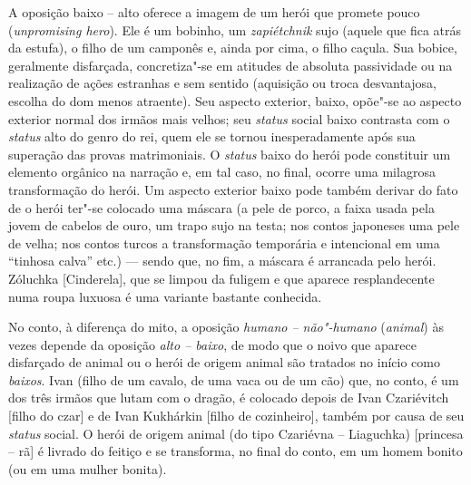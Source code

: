 


A oposição baixo -- alto oferece a imagem de um herói que promete pouco
(\emph{unpromising hero}). Ele é um bobinho, um \emph{zapiétchnik} sujo
(aquele que fica atrás da estufa), o filho de um camponês e, ainda por
cima, o filho caçula. Sua bobice, geralmente disfarçada, concretiza"-se
em atitudes de absoluta passividade ou na realização de ações estranhas
e sem sentido (aquisição ou troca desvantajosa, escolha do dom menos
atraente). Seu aspecto exterior, baixo, opõe"-se ao aspecto exterior
normal dos irmãos mais velhos; seu \emph{status} social baixo contrasta com
o \emph{status} alto do genro do rei, quem ele se tornou inesperadamente após
sua superação das provas matrimoniais. O \emph{status} baixo do herói pode
constituir um elemento orgânico na narração e, em tal caso, no final,
ocorre uma milagrosa transformação do herói. Um aspecto exterior baixo
pode também derivar do fato de o herói ter"-se colocado uma máscara (a
pele de porco, a faixa usada pela jovem de cabelos de ouro, um trapo
sujo na testa; nos contos japoneses uma pele de velha; nos contos turcos
a transformação temporária e intencional em uma ``tinhosa calva'' etc.)
--- sendo que, no fim, a máscara é arrancada pelo herói. Zóluchka
[Cinderela], que se limpou da fuligem e que aparece resplandecente
numa roupa luxuosa é uma variante bastante conhecida.

No conto, à diferença do mito, a oposição \emph{humano --
não"-humano} (\emph{animal}) às vezes depende da oposição \emph{alto -- baixo}, de
modo que o noivo que aparece disfarçado de animal ou o herói de origem
animal são tratados no início como \emph{baixos}. Ivan (filho de um cavalo,
de uma vaca ou de um cão) que, no conto, é um dos três irmãos que lutam
com o dragão, é colocado depois de Ivan Czariévitch [filho do czar]
e de Ivan Kukhárkin [filho de cozinheiro], também por causa de
seu \emph{status} social. O herói de origem animal (do tipo Czariévna --
Liaguchka) [princesa -- rã] é livrado do feitiço e se transforma, no
final do conto, em um homem bonito (ou em uma mulher bonita).

